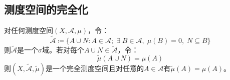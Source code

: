 \subsection{测度空间的完全化}
\begin{theorem}
	对任何测度空间$(X,\mathscr{A},\mu)$，令：
	\begin{equation*}
		\tilde{\mathscr{A}}\coloneq\{A\cup N:A\in\mathscr{A};\;\exists\;B\in\mathscr{A},\;\mu(B)=0,\;N\subseteq B\}
	\end{equation*}
	则$\tilde{\mathscr{A}}$是一个$\sigma$域。若对每个$A\cup N\in\tilde{\mathscr{A}}$，令：
	\begin{equation*}
		\tilde{\mu}(A\cup N)=\mu(A)
	\end{equation*}
	则$(X,\tilde{\mathscr{A}},\tilde{\mu})$是一个完全测度空间且对任意的$A\in\mathscr{A}$有$\tilde{\mu}(A)=\mu(A)$。
\end{theorem}
